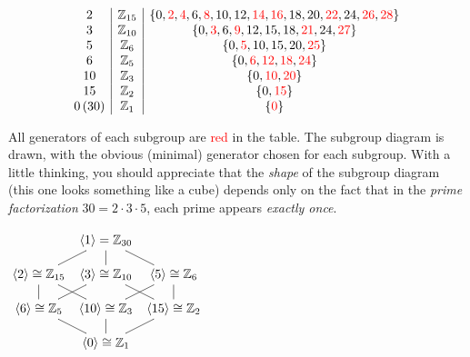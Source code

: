\begin{example}{}{}
\[\begin{array}[t]{c|c|c}
			2 & \mathbb{Z}_{15} & \{0,\textcolor{red}{2},\textcolor{red}{4},6,\textcolor{red}{8},10,12,\textcolor{red}{14},\textcolor{red}{16},18,20,\textcolor{red}{22},24,\textcolor{red}{26},\textcolor{red}{28}\}\\
			3 & \mathbb{Z}_{10} & \{0,\textcolor{red}{3},6,\textcolor{red}{9},12,15,18,\textcolor{red}{21},24,\textcolor{red}{27}\}\\
			5 & \mathbb{Z}_6 & \{0,\textcolor{red}{5},10,15,20,\textcolor{red}{25}\}\\
			6 & \mathbb{Z}_5 & \{0,\textcolor{red}{6},\textcolor{red}{12},\textcolor{red}{18},\textcolor{red}{24}\}\\
			10 & \mathbb{Z}_3 & \{0,\textcolor{red}{10},\textcolor{red}{20}\}\\
			15 & \mathbb{Z}_2 & \{0,\textcolor{red}{15}\}\\
			0\,(30) & \mathbb{Z}_1 & \{\textcolor{red}{0}\}
   \end{array}
  \]
    
	\begin{minipage}[t]{0.6\linewidth}\vspace{0pt}
		 All generators of each subgroup are \textcolor{red}{red} in the table. The subgroup diagram is drawn, with the obvious (minimal) generator chosen for each subgroup.\smallbreak
	With a little thinking, you should appreciate that the \emph{shape} of the subgroup diagram (this one looks something like a cube) depends only on the fact that in the \emph{prime factorization} $30=2\cdot 3\cdot 5$, each prime appears \emph{exactly once}.
	\end{minipage}
	\hfill
	\begin{minipage}[t]{0.39\linewidth}\vspace{0pt}
		\flushright%
		$\xymatrix @C5pt @R11pt{%
		 	& \ip{1}=\Z_{30} \ar@{-}[dl] \ar@{-}[d] \ar@{-}[dr] & \\
			\ip{2}\cong \Z_{15} \ar@{-}[d] \ar@{-}[dr] & \ip{3}\cong\Z_{10} \ar@{-}[dl] \ar@{-}[dr] & \ip{5}\cong\Z_6 \ar@{-}[d] \ar@{-}[dl] \\
			\ip{6}\cong\Z_5 \ar@{-}[dr] & \ip{10}\cong \Z_{3} \ar@{-}[d] & \ip{15}\cong\Z_2 \ar@{-}[dl] \\
 & \ip{0}\cong\Z_1 &}$
	\end{minipage}
 
\end{example}

\goodbreak

